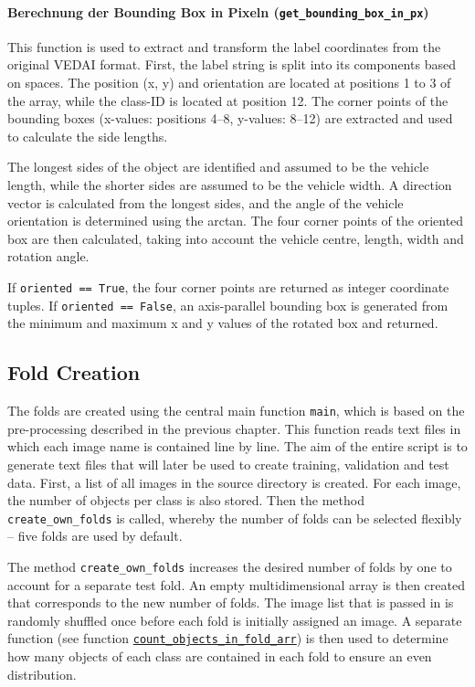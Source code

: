 \paragraph{Berechnung der Bounding Box in Pixeln (\lstinline|get_bounding_box_in_px|)}

This function is used to extract and transform the label coordinates from the original \acrshort{VEDAI} format. First, the label string is split into its components based on spaces. The position (x, y) and orientation are located at positions 1 to 3 of the array, while the class-\acrshort{ID} is located at position 12. The corner points of the bounding boxes (x-values: positions 4–8, y-values: 8–12) are extracted and used to calculate the side lengths.

The longest sides of the object are identified and assumed to be the vehicle length, while the shorter sides are assumed to be the vehicle width. A direction vector is calculated from the longest sides, and the angle of the vehicle orientation is determined using the arctan. The four corner points of the oriented box are then calculated, taking into account the vehicle centre, length, width and rotation angle.

If \lstinline|oriented == True|, the four corner points are returned as integer coordinate tuples. If \lstinline|oriented == False|, an axis-parallel bounding box is generated from the minimum and maximum x and y values of the rotated box and returned.


\subsection{Fold Creation}
\label{subsec:Fold_creation}


The folds are created using the central main function \lstinline|main|, which is based on the pre-processing described in the previous chapter. This function reads text files in which each image name is contained line by line. The aim of the entire script is to generate text files that will later be used to create training, validation and test data. First, a list of all images in the source directory is created. For each image, the number of objects per class is also stored. Then the method \lstinline|create_own_folds| is called, whereby the number of folds can be selected flexibly – five folds are used by default.

The method \lstinline|create_own_folds| increases the desired number of folds by one to account for a separate test fold. An empty multidimensional array is then created that corresponds to the new number of folds. The image list that is passed in is randomly shuffled once before each fold is initially assigned an image. A separate function (see function \hyperlink{par:count_objects_in_fold_arr}{\lstinline|count_objects_in_fold_arr|}) is then used to determine how many objects of each class are contained in each fold to ensure an even distribution.

